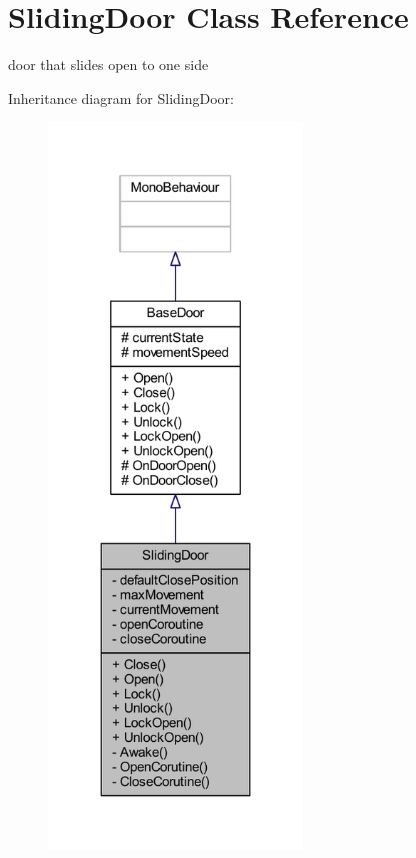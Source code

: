 \hypertarget{class_sliding_door}{}\section{Sliding\+Door Class Reference}
\label{class_sliding_door}


door that slides open to one side  




Inheritance diagram for Sliding\+Door\+:\nopagebreak
\begin{figure}[H]
\begin{center}
\leavevmode
\includegraphics[width=191pt]{class_sliding_door__inherit__graph}
\end{center}
\end{figure}


